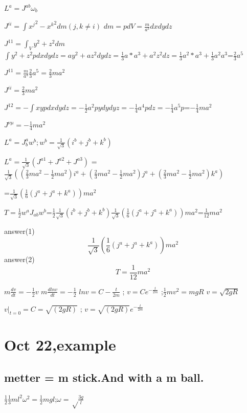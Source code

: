 \documentclass{article}
\begin{document}
  $L^a=J^{ab} \omega_b$

  $J^{ii}=\displaystyle\int {x^{j}}^2-{{x^k}^2} dm (j,k\ne i)$
 $dm = pdV = \frac{m}{a^3}dxdydz$

 $J^{11}=\displaystyle\int_V y^2+z^2 dm$ $\displaystyle\int y^2+z^2 p dxdydz = ay^2+az^2dydz = \frac{1}{3}a*a^3+a^2z^2dz=\frac{1}{3}a^2*a^3+\frac{1}{3}a^2a^3$=$\frac{2}{3}a^5$

 $J^{11}=\frac{m}{a^3}\frac{2}{3}a^5=\frac{2}{3}ma^2$

 $J^{ii}=\frac{2}{3}ma^2$

 $J^{12}=-\displaystyle\int xy p dxdydz=-\frac{1}{2}a^2 p y dydyz = -\frac{1}{4}a^4 p dz =- \frac{1}{4}a^5p$=$-\frac{1}{4}ma^2$

 $J^{\nu\mu}=-\frac{1}{4}ma^2$


 $ L^a=J^{a}_{b}w^b;w^b=\frac{1}{\sqrt{3}}(i^b+j^b+k^b)$

 $ L^a=\frac{1}{\sqrt{3}}(J^{a1}+J^{a2}+J^{a3})$ = $\frac{1}{\sqrt{3}}((\frac{2}{3}ma^2-\frac{1}{2}ma^2)i^a+(\frac{2}{3}ma^2-\frac{1}{2}ma^2)j^a+(\frac{2}{3}ma^2-\frac{1}{2}ma^2)k^a)$


 =$\frac{1}{\sqrt{3}}(\frac{1}{6}(j^a+j^a+k^a))ma^2$
 
 $T=\frac{1}{2}w^aJ_{ab}w^b$=$\frac{1}{2}\frac{1}{\sqrt{3}}(i^b+j^b+k^b)\frac{1}{\sqrt{3}}(\frac{1}{6}(j^a+j^a+k^a))ma^2$=$\frac{1}{12}ma^2$

 answer(1)
 \begin{equation}
   \frac{1}{\sqrt{3}}(\frac{1}{6}(j^a+j^a+k^a))ma^2
 \end{equation}
  answer(2)
\begin{equation}
T=\frac{1}{12}ma^2
\end{equation}

$m\frac{dv}{dt}=-\frac{1}{2}v$ $m\frac{dlnv}{dt}=-\frac{1}{2}$ $ lnv=C-\frac{t}{2m}$ ; $v=Ce^{-\frac{t}{2m}}$ ;$\frac{1}{2}mv^2 = mgR$ $v=\sqrt{2gR}$ 

$v|_{t=0}=C=\sqrt{(2gR)}$ ; $v=\sqrt{(2gR)}e^{-\frac{t}{2m}}$

\section{Oct 22,example}

\subsection{metter = m stick.And with a m ball.}

$\frac12\frac13ml^2\omega^2=\frac12mgl$;$\omega=\sqrt\frac{3g}{l}$
\end{document}
